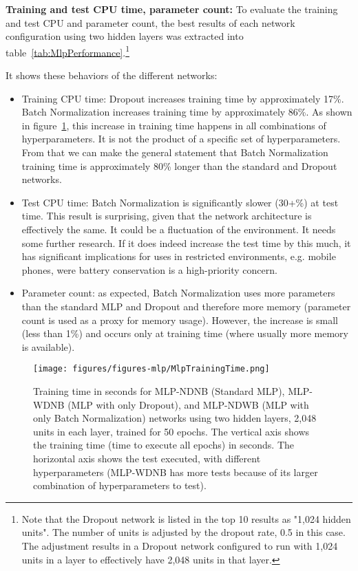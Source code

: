 \documentclass[../dropout-vs-batch-normalization.tex]{subfiles}
\begin{document}
\smallskip
\noindent\textbf{Training and test CPU time, parameter count:} To evaluate the training and test CPU and parameter count, the best results of each network configuration using two hidden layers was extracted into table~\ref{tab:MlpPerformance}.\footnote{Note that the Dropout network is listed in the top 10 results as "1,024 hidden units". The number of units is adjusted by the dropout rate, 0.5 in this case. The adjustment results in a Dropout network configured to run with 1,024 units in a layer to effectively have 2,048 units in that layer.}

It shows these behaviors of the different networks:

\begin{itemize}
\item Training CPU time: Dropout increases training time by approximately 17\%. Batch Normalization increases training time by approximately 86\%. As shown in figure~\ref{fig:MlpTrainingTime}, this increase in training time happens in all combinations of hyperparameters. It is not the product of a specific set of hyperparameters. From that we can make the general statement that Batch Normalization training time is approximately 80\% longer than the standard and Dropout networks.
\item Test CPU time: Batch Normalization is significantly slower (30+\%) at test time. This result is surprising, given that the network architecture is effectively the same. It could be a fluctuation of the environment. It needs some further research. If it does indeed increase the test time by this much, it has significant implications for uses in restricted environments, e.g. mobile phones, were battery conservation is a high-priority concern.
\item Parameter count: as expected, Batch Normalization uses more parameters than the standard MLP and Dropout and therefore more memory (parameter count is used as a proxy for memory usage). However, the increase is small (less than 1\%) and occurs only at training time (where usually more memory is available).
\end{itemize}

\begin{figure}
\centerline{\texttt{[image: figures/figures-mlp/MlpTrainingTime.png]}}
\caption{Training time in seconds for MLP-NDNB (Standard MLP), MLP-WDNB (MLP with only Dropout), and MLP-NDWB (MLP with only Batch Normalization) networks using two hidden layers, 2,048 units in each layer, trained for 50 epochs. The vertical axis shows the training time (time to execute all epochs) in seconds. The horizontal axis shows the test executed, with different hyperparameters (MLP-WDNB has more tests because of its larger combination of hyperparameters to test).}
\label{fig:MlpTrainingTime}
\end{figure}
\end{document}
